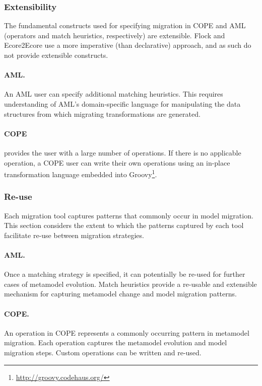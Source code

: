 \subsubsection{Extensibility}
The fundamental constructs used for specifying migration in COPE and AML (operators and match heuristics, respectively) are extensible. Flock and Ecore2E\-core use a more imperative (than declarative) approach, and as such do not provide extensible constructs.

\paragraph{AML.} An AML user can specify additional matching heuristics. This requires understanding of AML's domain-specific language for manipulating the data structures from which migrating transformations are generated.

\paragraph{COPE} provides the user with a large number of operations. If there is no applicable operation, a COPE user can write their own operations using an in-place transformation language embedded into Groovy\footnote{\url{http://groovy.codehaus.org/}}.


\subsubsection{Re-use}
Each migration tool captures patterns that commonly occur in model migration. This section considers the extent to which the patterns captured by each tool facilitate re-use between migration strategies.

\paragraph{AML.} Once a matching strategy is specified, it can potentially be re-used for further cases of metamodel evolution. Match heuristics provide a re-usable and extensible mechanism for capturing metamodel change and model migration patterns.

\paragraph{COPE.} An operation in COPE represents a commonly occurring pattern in metamodel migration. Each operation captures the metamodel evolution and model migration steps. Custom operations can be written and re-used.

